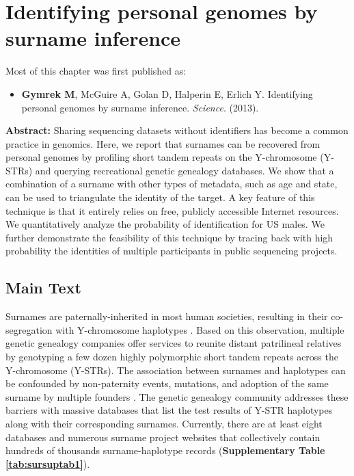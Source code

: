 \chapter{Identifying personal genomes by surname inference}
\label{chap:surname}
\hzline

Most of this chapter was first published as:

\begin{itemize}

\item[] \textbf{Gymrek M}, McGuire A, Golan D, Halperin E, Erlich Y. Identifying personal genomes by surname inference. \emph{Science}. (2013).
\end{itemize}

\hzline


\textbf{Abstract:} Sharing sequencing datasets without identifiers has become a common practice in genomics. Here, we report that surnames can be recovered from personal genomes by profiling short tandem repeats on the Y-chromosome (Y-STRs) and querying recreational genetic genealogy databases. We show that a combination of a surname with other types of metadata, such as age and state, can be used to triangulate the identity of the target. A key feature of this technique is that it entirely relies on free, publicly accessible Internet resources. We quantitatively analyze the probability of identification for US males. We further demonstrate the feasibility of this technique by tracing back with high probability the identities of multiple participants in public sequencing projects.

\section{Main Text}
Surnames are paternally-inherited in most human societies, resulting in their co-segregation with Y-chromosome haplotypes \cite{SykesIrven2000,KingBallereauSchurerEtAl2006,McEvoyBradley2006,KingJobling2009,KingJobling2009a}. Based on this observation, multiple genetic genealogy companies offer services to reunite distant patrilineal relatives by genotyping a few dozen highly polymorphic short tandem repeats across the Y-chromosome (Y-STRs). The association between surnames and haplotypes can be confounded by non-paternity events, mutations, and adoption of the same surname by multiple founders \cite{KingJobling2009}. The genetic genealogy community addresses these barriers with massive databases that list the test results of Y-STR haplotypes along with their corresponding surnames. Currently, there are at least eight databases and numerous surname project websites that collectively contain hundreds of thousands surname-haplotype records (\textbf{Supplementary Table \ref{tab:sursuptab1}}). 

